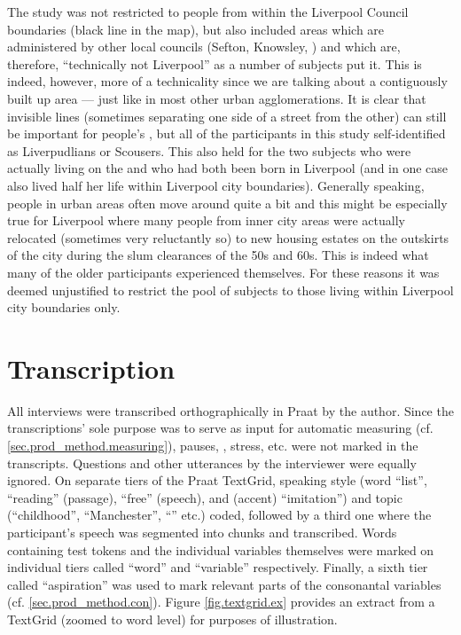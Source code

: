 The study was not restricted to people from within the Liverpool Council boundaries (black line in the map), but also included areas which are administered by other local councils (Sefton, Knowsley, ) and which are, therefore, ``technically not Liverpool'' as a number of subjects put it. This is indeed, however, more of a technicality since we are talking about a contiguously built up area --- just like in most other urban agglomerations. It is clear that invisible lines (sometimes separating one side of a street from the other) can still be important for people's , but all of the participants in this study self-identified as Liverpudlians or Scousers. This also held for the two subjects who were actually living on the  and who had both been born in Liverpool (and in one case also lived half her life within Liverpool city boundaries). Generally speaking, people in urban areas often move around quite a bit and this might be especially true for Liverpool where many people from inner city areas were actually relocated (sometimes very reluctantly so) to new housing estates on the outskirts of the city during the slum clearances of the 50s and 60s. This is indeed what many of the older participants experienced themselves. For these reasons it was deemed unjustified to restrict the pool of subjects to those living within Liverpool city boundaries only.

	\section{Transcription}\label{sec.prod_method.transcription}

All interviews were transcribed orthographically in Praat \parencite{praat} by the author.
Since the transcriptions' sole purpose was to serve as input for automatic measuring (cf. \ref{sec.prod_method.measuring}), pauses, , stress, etc. were not marked in the transcripts.
Questions and other utterances by the interviewer were equally ignored.
On separate tiers of the Praat TextGrid, speaking style (word ``list'', ``reading'' (passage), ``free'' (speech), and (accent) ``imitation'') and topic (``childhood'', ``Manchester'', ``'' etc.) coded, followed by a third one where the participant's speech was segmented into chunks and transcribed.
Words containing test tokens and the individual variables themselves were marked on individual tiers called ``word'' and ``variable'' respectively.
Finally, a sixth tier called ``aspiration'' was used to mark relevant parts of the consonantal variables (cf. \ref{sec.prod_method.con}).
Figure \ref{fig.textgrid.ex} provides an extract from a TextGrid (zoomed to word level) for purposes of illustration.

